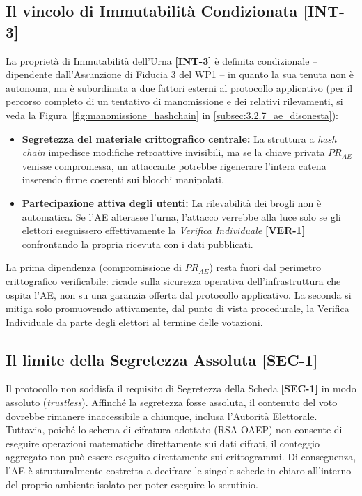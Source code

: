 \subsection{Il vincolo di Immutabilità Condizionata [INT-3]}
\label{subsec:3.3.3_vincolo_int3}

La proprietà di Immutabilità dell'Urna \textbf{[INT-3]} è definita condizionale -- dipendente dall'Assunzione di Fiducia 3 del WP1 -- in quanto la sua tenuta non è autonoma, ma è subordinata a due fattori esterni al protocollo applicativo (per il percorso completo di un tentativo di manomissione e dei relativi rilevamenti, si veda la Figura~\ref{fig:manomissione_hashchain} in \ref{subsec:3.2.7_ae_disonesta}):
\begin{itemize}
    \item \textbf{Segretezza del materiale crittografico centrale:} La struttura a \textit{hash chain} impedisce modifiche retroattive invisibili, ma se la chiave privata $PR_{AE}$ venisse compromessa, un attaccante potrebbe rigenerare l'intera catena inserendo firme coerenti sui blocchi manipolati.
    \item \textbf{Partecipazione attiva degli utenti:} La rilevabilità dei brogli non è automatica. Se l'AE alterasse l'urna, l'attacco verrebbe alla luce solo se gli elettori eseguissero effettivamente la \textit{Verifica Individuale} \textbf{[VER-1]} confrontando la propria ricevuta con i dati pubblicati.
\end{itemize}
La prima dipendenza (compromissione di $PR_{AE}$) resta fuori dal perimetro crittografico verificabile: ricade sulla sicurezza operativa dell'infrastruttura che ospita l'AE, non su una garanzia offerta dal protocollo applicativo. La seconda si mitiga solo promuovendo attivamente, dal punto di vista procedurale, la Verifica Individuale da parte degli elettori al termine delle votazioni.

\subsection{Il limite della Segretezza Assoluta [SEC-1]}
\label{subsec:3.3.4_limite_sec1}

Il protocollo non soddisfa il requisito di Segretezza della Scheda \textbf{[SEC-1]} in modo assoluto (\textit{trustless}). Affinché la segretezza fosse assoluta, il contenuto del voto dovrebbe rimanere inaccessibile a chiunque, inclusa l'Autorità Elettorale. Tuttavia, poiché lo schema di cifratura adottato (RSA-OAEP) non consente di eseguire operazioni matematiche direttamente sui dati cifrati, il conteggio aggregato non può essere eseguito direttamente sui crittogrammi. Di conseguenza, l'AE è strutturalmente costretta a decifrare le singole schede in chiaro all'interno del proprio ambiente isolato per poter eseguire lo scrutinio.

